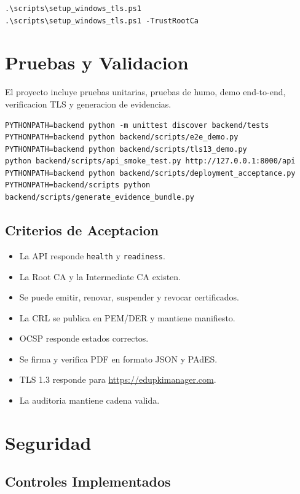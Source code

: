 \documentclass[12pt,a4paper]{article}
\begin{document}
\begin{lstlisting}[style=code]
.\scripts\setup_windows_tls.ps1
.\scripts\setup_windows_tls.ps1 -TrustRootCa
\end{lstlisting}

\section{Pruebas y Validacion}

El proyecto incluye pruebas unitarias, pruebas de humo, demo end-to-end, verificacion TLS y generacion de evidencias.

\begin{lstlisting}[style=code]
PYTHONPATH=backend python -m unittest discover backend/tests
PYTHONPATH=backend python backend/scripts/e2e_demo.py
PYTHONPATH=backend python backend/scripts/tls13_demo.py
python backend/scripts/api_smoke_test.py http://127.0.0.1:8000/api
PYTHONPATH=backend python backend/scripts/deployment_acceptance.py
PYTHONPATH=backend/scripts python backend/scripts/generate_evidence_bundle.py
\end{lstlisting}

\subsection{Criterios de Aceptacion}

\begin{itemize}[leftmargin=*]
    \item La API responde \texttt{health} y \texttt{readiness}.
    \item La Root CA y la Intermediate CA existen.
    \item Se puede emitir, renovar, suspender y revocar certificados.
    \item La CRL se publica en PEM/DER y mantiene manifiesto.
    \item OCSP responde estados correctos.
    \item Se firma y verifica PDF en formato JSON y PAdES.
    \item TLS 1.3 responde para \url{https://edupkimanager.com}.
    \item La auditoria mantiene cadena valida.
\end{itemize}

\section{Seguridad}

\subsection{Controles Implementados}
\end{document}
